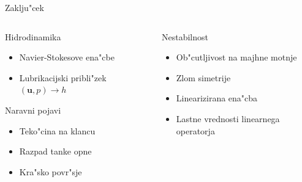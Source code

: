 \documentclass{beamer}
\renewcommand{\vec}{\mathbf}
\begin{document}
\begin{frame}{Zaklju"cek}
\begin{columns}
 \begin{column}{0.45\textwidth}
  \begin{block}{Hidrodinamika}
  \begin{itemize}
   \item Navier-Stokesove ena"cbe
   \item Lubrikacijski pribli"zek $(\vec u, p) \rightarrow h$
  \end{itemize}
  \end{block}
  
  \begin{block}{Naravni pojavi}
    \begin{itemize}
     \item Teko"cina na klancu
     \item Razpad tanke opne
     \item Kra"sko povr"sje
    \end{itemize}
 \end{block}
 \end{column}
 
\begin{column}{0.45\textwidth}
  \begin{block}{Nestabilnost}
   \begin{itemize}
    \item Ob"cutljivost na majhne motnje
    \item Zlom simetrije
    \item Linearizirana ena"cba
    \item Lastne vrednosti linearnega operatorja
   \end{itemize}
  \end{block}

 \end{column}

\end{columns}

\end{frame}
\end{document}
